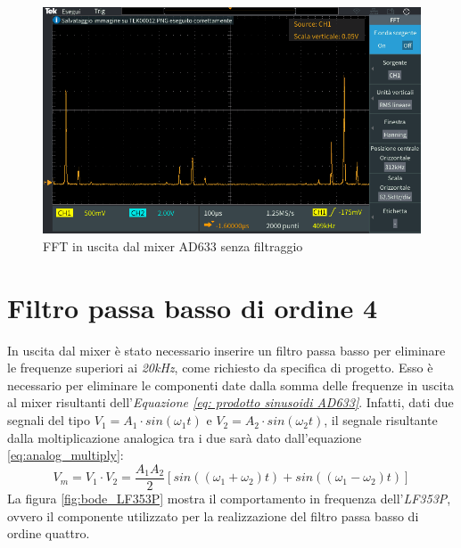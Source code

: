 \documentclass[titlepage]{report}
\begin{document}
	\begin{figure}[H]
		\centering
		\includegraphics[scale = 0.5]{Immagini/ad633_fft_mixed.PNG}
		\caption{FFT in uscita dal mixer AD633 senza filtraggio}
		\label{fig:FFTAD633}
	\end{figure}



	\label{ch:Risultati}
	
\newpage
\section{Filtro passa basso di ordine 4}
	In uscita dal mixer è stato necessario inserire un filtro passa basso per eliminare le frequenze superiori ai \textit{20kHz}, come richiesto da specifica di progetto. Esso è necessario per eliminare le componenti date dalla somma delle frequenze in uscita al mixer risultanti dell'\textit{Equazione \ref{eq: prodotto sinusoidi AD633}}. Infatti, dati due segnali del tipo $ V_1 = A_1 \cdot sin(\omega_1t) $
	e $ V_2 = A_2 \cdot sin(\omega_2t) $, il segnale risultante dalla moltiplicazione analogica tra i due sarà dato dall'equazione \ref{eq:analog_multiply}:
	\begin{equation}
		V_m = V_1 \cdot V_2 = \frac{A_1A_2}{2}[sin((\omega_1 + \omega_2)t) + sin((\omega_1 - \omega_2)t)]
		\label{eq:analog_multiply}
	\end{equation}
	La figura \ref{fig:bode_LF353P} mostra il comportamento in frequenza dell'\textit{LF353P}, ovvero il componente utilizzato per la realizzazione del filtro passa basso di ordine quattro.
\end{document}
